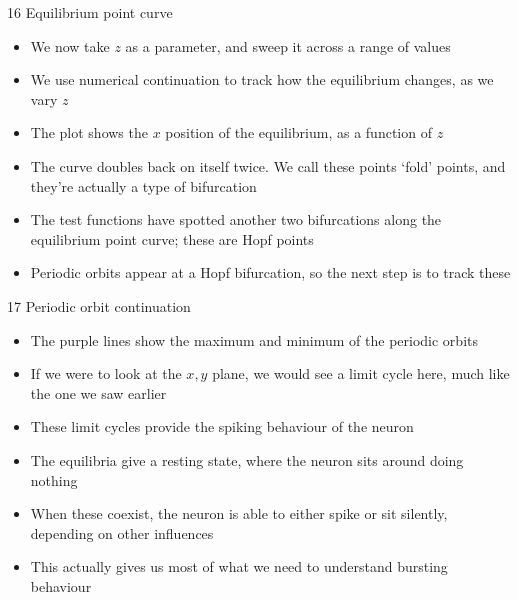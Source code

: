 \documentclass[presentation]{beamer}
\begin{document}
\begin{frame}[label={sec:org83abb81}]{16 Equilibrium point curve}
\begin{itemize}
\item We now take \(z\) as a parameter, and sweep it across a range of values
\item We use numerical continuation to track how the equilibrium changes, as we vary \(z\)
\item The plot shows the \(x\) position of the equilibrium, as a function of \(z\)
\item The curve doubles back on itself twice. We call these points `fold' points, and they're actually a type of bifurcation
\item The test functions have spotted another two bifurcations along the equilibrium point curve; these are Hopf points
\item Periodic orbits appear at a Hopf bifurcation, so the next step is to track these
\end{itemize}
\end{frame}

\begin{frame}[label={sec:orga384bf1}]{17 Periodic orbit continuation}
\begin{itemize}
\item The purple lines show the maximum and minimum of the periodic orbits
\item If we were to look at the \(x,y\) plane, we would see a limit cycle here, much like the one we saw earlier
\item These limit cycles provide the spiking behaviour of the neuron
\item The equilibria give a resting state, where the neuron sits around doing nothing
\item When these coexist, the neuron is able to either spike or sit silently, depending on other influences
\item This actually gives us most of what we need to understand bursting behaviour
\end{itemize}
\end{frame}
\end{document}
